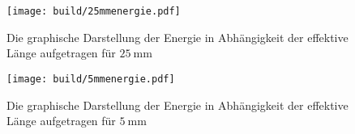 \begin{figure}
    \centering
    \texttt{[image: build/25mmenergie.pdf]}
    \caption{Die graphische Darstellung der Energie in Abhängigkeit der effektive Länge aufgetragen für $\SI{25}{\milli\metre}$}
    \label{fig:25mmenergie}
\end{figure}

\begin{figure}
    \centering
    \texttt{[image: build/5mmenergie.pdf]}
    \label{fig:5mmenergie}
  \caption{Die graphische Darstellung der Energie in Abhängigkeit der effektive Länge aufgetragen für $\SI{5}{\milli\metre}$}
\end{figure}
